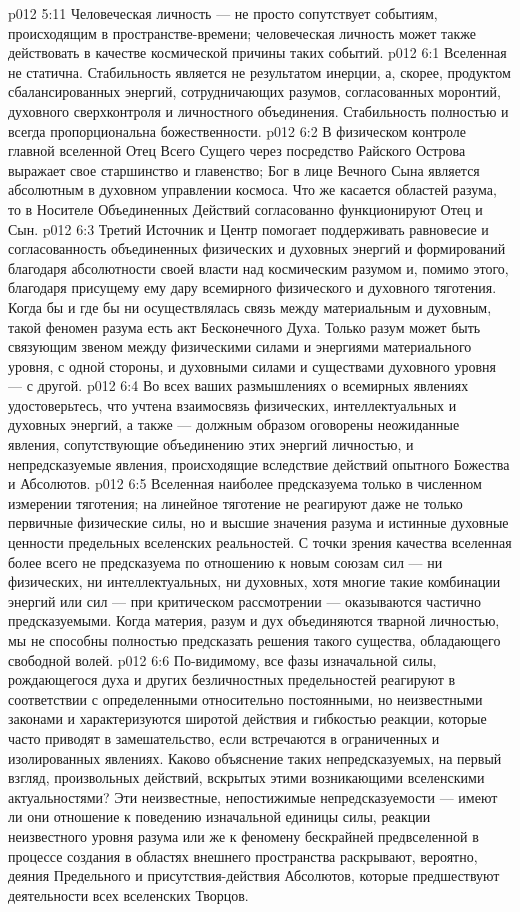 \vs p012 5:11 Человеческая личность --- не просто сопутствует событиям, происходящим в пространстве\hyp{}времени; человеческая личность может также действовать в качестве космической причины таких событий.
\vs p012 6:1 Вселенная не статична. Стабильность является не результатом инерции, а, скорее, продуктом сбалансированных энергий, сотрудничающих разумов, согласованных моронтий, духовного сверхконтроля и личностного объединения. Стабильность полностью и всегда пропорциональна божественности.
\vs p012 6:2 В физическом контроле главной вселенной Отец Всего Сущего через посредство Райского Острова выражает свое старшинство и главенство; Бог в лице Вечного Сына является абсолютным в духовном управлении космоса. Что же касается областей разума, то в Носителе Объединенных Действий согласованно функционируют Отец и Сын.
\vs p012 6:3 Третий Источник и Центр помогает поддерживать равновесие и согласованность объединенных физических и духовных энергий и формирований благодаря абсолютности своей власти над космическим разумом и, помимо этого, благодаря присущему ему дару всемирного физического и духовного тяготения. Когда бы и где бы ни осуществлялась связь между материальным и духовным, такой феномен разума есть акт Бесконечного Духа. Только разум может быть связующим звеном между физическими силами и энергиями материального уровня, с одной стороны, и духовными силами и существами духовного уровня --- с другой.
\vs p012 6:4 Во всех ваших размышлениях о всемирных явлениях удостоверьтесь, что учтена взаимосвязь физических, интеллектуальных и духовных энергий, а также --- должным образом оговорены неожиданные явления, сопутствующие объединению этих энергий личностью, и непредсказуемые явления, происходящие вследствие действий опытного Божества и Абсолютов.
\vs p012 6:5 Вселенная наиболее предсказуема только в численном измерении тяготения; на линейное тяготение не реагируют даже не только первичные физические силы, но и высшие значения разума и истинные духовные ценности предельных вселенских реальностей. С точки зрения качества вселенная более всего не предсказуема по отношению к новым союзам сил --- ни физических, ни интеллектуальных, ни духовных, хотя многие такие комбинации энергий или сил --- при критическом рассмотрении --- оказываются частично предсказуемыми. Когда материя, разум и дух объединяются тварной личностью, мы не способны полностью предсказать решения такого существа, обладающего свободной волей.
\vs p012 6:6 \pc По\hyp{}видимому, все фазы изначальной силы, рождающегося духа и других безличностных предельностей реагируют в соответствии с определенными относительно постоянными, но неизвестными законами и характеризуются широтой действия и гибкостью реакции, которые часто приводят в замешательство, если встречаются в ограниченных и изолированных явлениях. Каково объяснение таких непредсказуемых, на первый взгляд, произвольных действий, вскрытых этими возникающими вселенскими актуальностями? Эти неизвестные, непостижимые непредсказуемости --- имеют ли они отношение к поведению изначальной единицы силы, реакции неизвестного уровня разума или же к феномену бескрайней предвселенной в процессе создания в областях внешнего пространства раскрывают, вероятно, деяния Предельного и присутствия\hyp{}действия Абсолютов, которые предшествуют деятельности всех вселенских Творцов.
